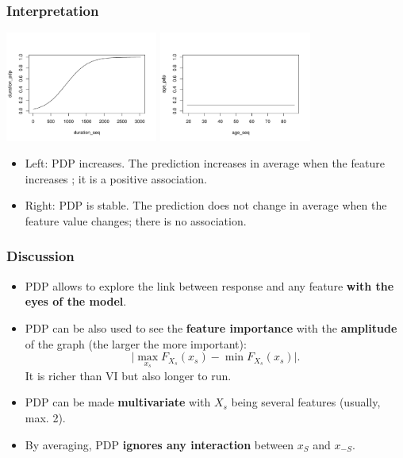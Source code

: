 \begin{frame}
\frametitle{Interpretation}
\begin{center}
\includegraphics[width=5cm]{../Graphs/PDP_Growing.png}
\includegraphics[width=5cm]{../Graphs/PDP_Stable.png}
\end{center}
\begin{itemize}
\item Left: PDP increases. The prediction increases in average when the feature increases ; it is a positive association.
\item Right: PDP is stable. The prediction does not change in average when the feature value changes; there is no association.
\end{itemize}
\end{frame}
\begin{frame}
\frametitle{Discussion}
\begin{itemize}
\item PDP allows to explore the link between response and any feature {\bf with the eyes of the model}.
\item PDP can be also used to see the {\bf feature importance} with the {\bf amplitude} of the graph (the larger the more important):
$$
\vert \max_{x_s} F_{X_s}(x_s) - \min F_{X_s}(x_s) \vert.
$$ 
It is richer than VI but also longer to run.
\item PDP can be made {\bf multivariate} with $X_s$ being several features (usually, max. 2).
\item By averaging, PDP {\bf ignores any interaction} between $x_S$ and $x_{-S}$.
\end{itemize}
\end{frame}
